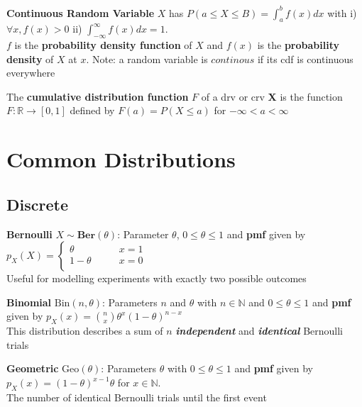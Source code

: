 \documentclass[5pt]{article}
\begin{document}
\begin{definition}
\textbf{Continuous Random Variable} $X$ has $P(a\leq X \leq B) = \int^b_a f(x) dx$ with i) $\forall x, f(x) > 0$ ii) $\int^\infty_{-\infty}f(x)dx = 1$.\\
$f$ is the \textbf{probability density function} of $X$ and $f(x)$ is the \textbf{probability density} of $X$ at $x$. Note: a random variable is $continous$ if its cdf is continuous everywhere
\end{definition}

\begin{definition}
The \textbf{cumulative distribution function} $F$ of a drv or crv \textbf{X} is the function $F: \mathbb{R}\to [0,1]$ defined by $F(a) = P(X \leq a)$ for $-\infty < a < \infty$
\end{definition}

\section{Common Distributions}
\subsection{Discrete}
\begin{definition}
\textbf{Bernoulli} $X \sim \textbf{Ber}(\theta)$: Parameter $\theta$, $0 \leq \theta \leq 1$ and \textbf{pmf} given by
$
p_X(X)=
\begin{cases}
\theta &\qquad x = 1\\
1 - \theta &\qquad x = 0\\ 
\end{cases}$\\
Useful for modelling experiments with exactly two possible outcomes
\end{definition}

\begin{definition}
\textbf{Binomial} $\text{Bin}(n,\theta)$: Parameters $n$ and $\theta$ with $n \in \mathbb{N}$ and $0 \leq \theta \leq 1$ and \textbf{pmf} given by $p_X(x) = {n \choose x}\theta^x(1-\theta)^{n-x}$\\
This distribution describes a sum of $n$ \emph{\textbf{independent}} and \emph{\textbf{identical}} Bernoulli trials
\end{definition}

\begin{definition}
\textbf{Geometric} $\text{Geo}(\theta)$: Parameters $\theta$ with $0 \leq \theta \leq 1$ and \textbf{pmf} given by $p_X(x) = (1-\theta)^{x-1} \theta$ for $x \in \mathbb{N}.$\\
The number of identical Bernoulli trials until the first event
\end{definition}
\end{document}
